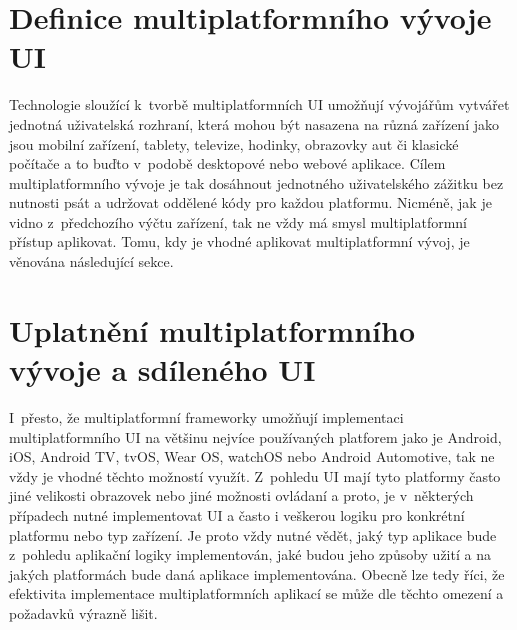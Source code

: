 \begin{sloppypar}
\section{Definice multiplatformního vývoje UI}
Technologie sloužící k~tvorbě multiplatformních UI umožňují vývojářům vytvářet jednotná uživatelská rozhraní, 
která mohou být nasazena na různá zařízení jako jsou mobilní zařízení, tablety, televize, hodinky, obrazovky aut či 
klasické počítače a to buďto v~podobě desktopové nebo webové aplikace. Cílem multiplatformního vývoje je tak dosáhnout jednotného 
uživatelského zážitku bez nutnosti psát a udržovat oddělené kódy pro každou platformu. Nicméně, jak je vidno z~předchozího výčtu zařízení, 
tak ne vždy má smysl multiplatformní přístup aplikovat. Tomu, kdy je vhodné aplikovat multiplatformní vývoj, je věnována následující sekce.  
\end{sloppypar}


\section{Uplatnění multiplatformního vývoje a sdíleného UI}
I~přesto, že multiplatformní frameworky umožňují implementaci multiplatformního UI na většinu nejvíce používaných platforem jako je Android, iOS,
Android TV, tvOS, Wear OS, watchOS nebo Android Automotive, tak ne vždy je vhodné těchto možností využít. Z~pohledu UI mají tyto platformy často jiné 
velikosti obrazovek nebo jiné možnosti ovládaní a proto, je v~některých případech nutné implementovat UI a často i veškerou logiku pro konkrétní platformu
nebo typ zařízení. Je proto vždy nutné vědět, jaký typ aplikace bude z~pohledu aplikační logiky implementován, jaké budou jeho způsoby užití a na jakých 
platformách bude daná aplikace implementována.
Obecně lze tedy říci, že efektivita implementace multiplatformních aplikací se může dle těchto omezení a požadavků výrazně lišit.


